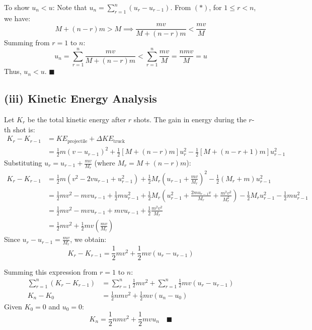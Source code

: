 \documentclass[12pt]{article}
\begin{document}
To show $u_n < u$:
Note that $u_n = \sum_{r=1}^{n} (u_r - u_{r-1})$. From $(*)$, for $1 \le r < n$, we have:
\begin{equation*}
    M + (n-r)m > M \implies \frac{mv}{M + (n-r)m} < \frac{mv}{M}
\end{equation*}
Summing from $r=1$ to $n$:
\begin{equation*}
    u_n = \sum_{r=1}^{n} \frac{mv}{M + (n-r)m} < \sum_{r=1}^{n} \frac{mv}{M} = \frac{nmv}{M} = u
\end{equation*}
Thus, $u_n < u$. $\blacksquare$

\subsection*{(iii) Kinetic Energy Analysis}
Let $K_r$ be the total kinetic energy after $r$ shots. The gain in energy during the $r$-th shot is:
\begin{align*}
    K_r - K_{r-1} &= KE_{\text{projectile}} + \Delta KE_{\text{truck}} \\
    &= \frac{1}{2}m(v - u_{r-1})^2 + \frac{1}{2}[M + (n-r)m]u_r^2 - \frac{1}{2}[M + (n-r+1)m]u_{r-1}^2
\end{align*}
Substituting $u_r = u_{r-1} + \frac{mv}{M_r}$ (where $M_r = M + (n-r)m$):
\begin{align*}
    K_r - K_{r-1} &= \frac{1}{2}m(v^2 - 2vu_{r-1} + u_{r-1}^2) + \frac{1}{2}M_r \left( u_{r-1} + \frac{mv}{M_r} \right)^2 - \frac{1}{2}(M_r + m)u_{r-1}^2 \\
    &= \frac{1}{2}mv^2 - mvu_{r-1} + \frac{1}{2}mu_{r-1}^2 + \frac{1}{2}M_r \left( u_{r-1}^2 + \frac{2mu_{r-1}v}{M_r} + \frac{m^2v^2}{M_r^2} \right) - \frac{1}{2}M_r u_{r-1}^2 - \frac{1}{2}mu_{r-1}^2 \\
    &= \frac{1}{2}mv^2 - mvu_{r-1} + mvu_{r-1} + \frac{1}{2}\frac{m^2v^2}{M_r} \\
    &= \frac{1}{2}mv^2 + \frac{1}{2}mv \left( \frac{mv}{M_r} \right)
\end{align*}
Since $u_r - u_{r-1} = \frac{mv}{M_r}$, we obtain:
\begin{equation*}
    K_r - K_{r-1} = \frac{1}{2}mv^2 + \frac{1}{2}mv(u_r - u_{r-1})
\end{equation*}

Summing this expression from $r=1$ to $n$:
\begin{align*}
    \sum_{r=1}^{n} (K_r - K_{r-1}) &= \sum_{r=1}^{n} \frac{1}{2}mv^2 + \sum_{r=1}^{n} \frac{1}{2}mv(u_r - u_{r-1}) \\
    K_n - K_0 &= \frac{1}{2}nmv^2 + \frac{1}{2}mv(u_n - u_0)
\end{align*}
Given $K_0 = 0$ and $u_0 = 0$:
\begin{equation*}
    K_n = \frac{1}{2}nmv^2 + \frac{1}{2}mvu_n \quad \blacksquare
\end{equation*}
\end{document}
